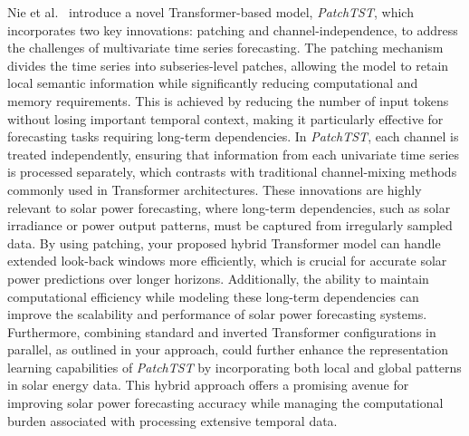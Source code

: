 \documentclass[12pt]{uomthesis}
\begin{document}
Nie et al.\ \cite{nie2022patchtst} introduce a novel Transformer-based model, \textit{PatchTST}, which incorporates two key innovations: patching and channel-independence, to address the challenges of multivariate time series forecasting. The patching mechanism divides the time series into subseries-level patches, allowing the model to retain local semantic information while significantly reducing computational and memory requirements. This is achieved by reducing the number of input tokens without losing important temporal context, making it particularly effective for forecasting tasks requiring long-term dependencies. In \textit{PatchTST}, each channel is treated independently, ensuring that information from each univariate time series is processed separately, which contrasts with traditional channel-mixing methods commonly used in Transformer architectures. These innovations are highly relevant to solar power forecasting, where long-term dependencies, such as solar irradiance or power output patterns, must be captured from irregularly sampled data. By using patching, your proposed hybrid Transformer model can handle extended look-back windows more efficiently, which is crucial for accurate solar power predictions over longer horizons. Additionally, the ability to maintain computational efficiency while modeling these long-term dependencies can improve the scalability and performance of solar power forecasting systems. Furthermore, combining standard and inverted Transformer configurations in parallel, as outlined in your approach, could further enhance the representation learning capabilities of \textit{PatchTST} by incorporating both local and global patterns in solar energy data. This hybrid approach offers a promising avenue for improving solar power forecasting accuracy while managing the computational burden associated with processing extensive temporal data.
\end{document}
